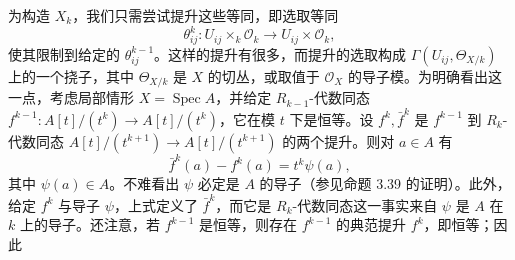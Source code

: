 为构造 $X_k$，我们只需尝试提升这些等同，即选取等同
\[
  \theta_{ij}^{k}:U_{ij}\times_k\mathcal{O}_k\longrightarrow U_{ij}\times\mathcal{O}_k,
\]
使其限制到给定的 $\theta_{ij}^{k-1}$。这样的提升有很多，而提升的选取构成 $\Gamma(U_{ij},\Theta_{X/k})$ 上的一个挠子，其中 $\Theta_{X/k}$ 是 $X$ 的切丛，或取值于 $\mathcal{O}_X$ 的导子模。为明确看出这一点，考虑局部情形 $X=\operatorname{Spec} A$，并给定 $R_{k-1}$-代数同态 $f^{k-1}:A[t]/(t^k)\to A[t]/(t^k)$，它在模 $t$ 下是恒等。设 $f^k,\bar f^k$ 是 $f^{k-1}$ 到 $R_k$-代数同态 $A[t]/(t^{k+1})\to A[t]/(t^{k+1})$ 的两个提升。则对 $a\in A$ 有
\[
  \bar f^k(a)-f^k(a)=t^k\psi(a),
\]
其中 $\psi(a)\in A$。不难看出 $\psi$ 必定是 $A$ 的导子（参见命题 3.39 的证明）。此外，给定 $f^k$ 与导子 $\psi$，上式定义了 $\bar f^k$，而它是 $R_k$-代数同态这一事实来自 $\psi$ 是 $A$ 在 $k$ 上的导子。还注意，若 $f^{k-1}$ 是恒等，则存在 $f^{k-1}$ 的典范提升 $f^k$，即恒等；因此

